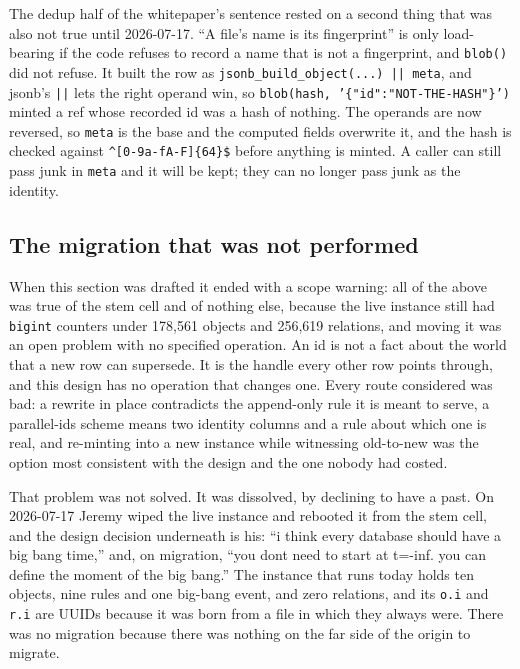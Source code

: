 The dedup half of the whitepaper's sentence rested on a second thing that was also not true until 2026-07-17. ``A file's name is its fingerprint'' is only load-bearing if the code refuses to record a name that is not a fingerprint, and \texttt{blob()} did not refuse. It built the row as \texttt{jsonb\_build\_object(...) || meta}, and jsonb's \texttt{||} lets the right operand win, so \texttt{blob(hash, '\{"id":"NOT-THE-HASH"\}')} minted a ref whose recorded id was a hash of nothing. The operands are now reversed, so \texttt{meta} is the base and the computed fields overwrite it, and the hash is checked against \verb|^[0-9a-fA-F]{64}$| before anything is minted. A caller can still pass junk in \texttt{meta} and it will be kept; they can no longer pass junk as the identity.

\subsection{The migration that was not performed}

When this section was drafted it ended with a scope warning: all of the above was true of the stem cell and of nothing else, because the live instance still had \texttt{bigint} counters under 178{,}561 objects and 256{,}619 relations, and moving it was an open problem with no specified operation. An id is not a fact about the world that a new row can supersede. It is the handle every other row points through, and this design has no operation that changes one. Every route considered was bad: a rewrite in place contradicts the append-only rule it is meant to serve, a parallel-ids scheme means two identity columns and a rule about which one is real, and re-minting into a new instance while witnessing old-to-new was the option most consistent with the design and the one nobody had costed.

That problem was not solved. It was dissolved, by declining to have a past. On 2026-07-17 Jeremy wiped the live instance and rebooted it from the stem cell, and the design decision underneath is his: ``i think every database should have a big bang time,'' and, on migration, ``you dont need to start at t=-inf. you can define the moment of the big bang.'' The instance that runs today holds ten objects, nine rules and one big-bang event, and zero relations, and its \texttt{o.i} and \texttt{r.i} are UUIDs because it was born from a file in which they always were. There was no migration because there was nothing on the far side of the origin to migrate.

